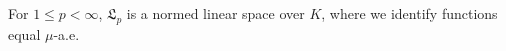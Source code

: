 For $1 \leq p < \infty$, $\mathfrak{L}_p$ is a normed linear space over $K$, where we identify functions equal $\mu$-a.e.
